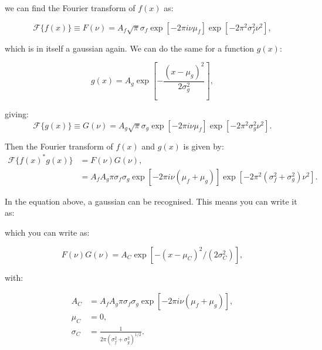 we can find the Fourier transform of $f(x)$ as:

\begin{equation}\label{eq_FT_gauss}
	\mathcal{F}\{f(x)\} \equiv F(\nu) = A_f \sqrt{\pi}\sigma_f \exp{\left[-2 \pi i \nu \mu_{f}\right]} \exp{\left[-2 \pi^{2} \sigma_{f}^{2} \nu^{2}\right]},
\end{equation}

which is in itself a gaussian again. We can do the same for a function $g(x)$:

\begin{equation}
g(x)=A_{g} \exp{\left[-\frac{\left(x-\mu_{g}\right)^{2}}{2 \sigma_{g}^{2}}\right]},
\end{equation}

giving:
\begin{equation}
	\mathcal{F}\{g(x)\} \equiv G(\nu) = A_g \sqrt{\pi}\sigma_g \exp{\left[-2 \pi i \nu \mu_{f}\right]} \exp{\left[-2 \pi^{2} \sigma_{g}^{2} \nu^{2}\right]}.
\end{equation}


Then the Fourier transform of $f(x)$ and $g(x)$ is given by:
\begin{equation}
\begin{aligned}
\mathcal{F}\{f(x)^*g(x)\} &= F(\nu)G(\nu), \\
 &=A_f A_g \pi \sigma_f \sigma_g \exp{\left[-2 \pi i \nu\left(\mu_{f}+\mu_{g}\right)\right]} \exp{\left[-2 \pi^{2}\left(\sigma_{f}^{2}+\sigma_{g}^{2}\right) \nu^{2}\right]}.
\end{aligned}
\end{equation}

In the equation above, a gaussian can be recognised. This means you can write it as:

which you can write as:

\begin{equation}
F(\nu)G(\nu) = A_C \exp{[-(x-\mu_C)^2/(2\sigma_C^2)]},
\end{equation}

with:

\begin{equation}
\begin{aligned}
A_C &= A_f A_g \pi \sigma_f \sigma_g \exp{\left[-2 \pi i \nu\left(\mu_{f}+\mu_{g}\right)\right]} ,\\
\mu_C &= 0,\\
\sigma_C &= \frac{1}{2\pi(\sigma_f^2+\sigma_g^2)^{1/2}}.
\end{aligned}
\end{equation}




